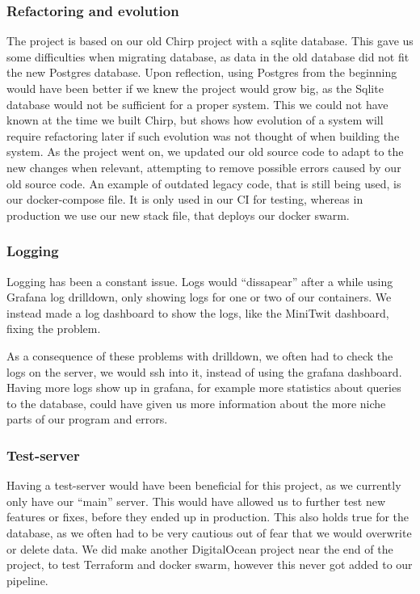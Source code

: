 \subsubsection{Refactoring and evolution}\label{migrating-database}
The project is based on our old Chirp project with a sqlite database. 
This gave us some difficulties when migrating database, as data in the old database did not fit the new Postgres database.  
Upon reflection, using Postgres from the beginning would have been better if we knew the project would grow big, as the Sqlite database would not be sufficient for a proper system.
This we could not have known at the time we built Chirp, but shows how evolution of a system will require refactoring later if such evolution was not thought of when building the system.
As the project went on, we updated our old source code to adapt to the new changes when relevant, attempting to remove possible errors caused by our old source code.
An example of outdated legacy code, that is still being used, is our docker-compose file. 
It is only used in our CI for testing, whereas in production we use our new stack file, that deploys our docker swarm.

\subsubsection{Logging}\label{reflection-logging}

Logging has been a constant issue. Logs would ``dissapear'' after a
while using Grafana log drilldown, only showing logs for one or two of
our containers. We instead made a log dashboard to show the logs, like the MiniTwit
dashboard, fixing the problem. 

As a consequence of these problems with drilldown, we often had to check the logs on the server, we would ssh into
it, instead of using the grafana dashboard. Having more logs show up in
grafana, for example more statistics about queries to the database, could
have given us more information about the more niche parts of our program
and errors.

\subsubsection{Test-server}\label{test-server}

Having a test-server would have been beneficial for this project, as we
currently only have our ``main'' server. This would have allowed us to
further test new features or fixes, before they ended up in production.
This also holds true for the database, as we often had to be very
cautious out of fear that we would overwrite or delete data. We did make
another DigitalOcean project near the end of the project, to test Terraform and docker
swarm, however this never got added to our pipeline.

